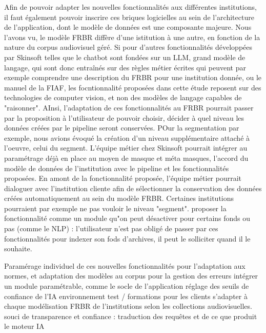 Afin de pouvoir adapter les nouvelles fonctionnalités aux différentes institutions, il faut également pouvoir inscrire ces briques logicielles au sein de l'architecture de l'application, dont le modèle de données est une composante majeure. Nous l'avons vu, le modèle FRBR diffère d'une istitution à une autre, en fonction de la nature du corpus audiovisuel géré. 
Si pour d'autres fonctionnalités développées par Skinsoft telles que le chatbot sont fondées sur un LLM, grand modèle de langage, qui sont donc entraînés sur des règles métier écrites qui peuvent par exemple comprendre une description du FRBR pour une institution donnée, ou le manuel de la FIAF, les focntionnalité proposées dans cette étude reposent sur des technologies de computer vision, et non des modèles de langage capables de "raisonner". AInsi, l'adaptation de ces fonctionnalités au FRBR pourrait passer par la proposition à l'utilisateur de pouvoir choisir, décider à quel niveau les données créées par le pipeline seront conservées. POur la segmentation par exemple, nous avions évoqué la création d'un niveau supplémentaire attaché à l'oeuvre, celui du segment. L'équipe métier chez Skinsoft pourrait intégrer au paramétrage déjà en place au moyen de masque et méta masques, l'accord du modèle de données de l'institution avec le pipeline et les fonctionnalités proposées. En amont de la fonctionnalité proposée, l'équipe métier pourrait dialoguer avec l'institution cliente afin de sélectionner la conservation des données créées automatiquement au sein du modèle FRBR. Certaines institutions pourraient par exemple ne pas vouloir le niveau "segment". 
proposer la fonctionnalité comme un module qu"on peut désactiver pour certains fonds ou pas (comme le NLP) : l'utilisateur n'est pas obligé de passer par ces fonctionnalités pour indexer son fods d'archives, il peut le solliciter quand il le souhaite. 

Paramérage individuel de ces nouvelles fonctionnalités pour l'adaptation aux normes, et adaptation des modèles au corpus pour la gestion des erreurs 
intégrer un module paramétrable, comme le socle de l'application 
réglage des seuils de confiance de l'IA 
environnement test / formations pour les clients 
s'adapter à chaque modélisation FRBR de l'institutions selon les collections audiovisuelles. 
souci de transparence et confiance : traduction des requêtes et de ce que produit le moteur IA 